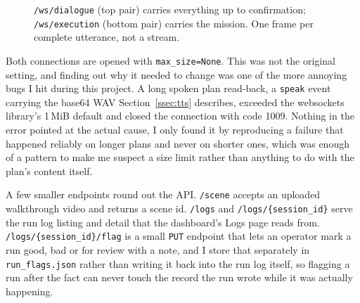 \begin{figure}[htbp]
  \centering
  \caption{\texttt{/ws/dialogue} (top pair) carries everything up to confirmation; \texttt{/ws/execution} (bottom pair) carries the mission. One frame per complete utterance, not a stream.}
  \label{fig:protocol}
\end{figure}

Both connections are opened with \texttt{max\_size=None}. This was not the
original setting, and finding out why it needed to change was one of the
more annoying bugs I hit during this project. A long spoken plan read-back,
a \texttt{speak} event carrying the base64 WAV Section~\ref{ssec:tts}
describes, exceeded the websockets library's 1\,MiB default and closed the
connection with code 1009. Nothing in the error pointed at the actual
cause, I only found it by reproducing a failure that happened reliably on
longer plans and never on shorter ones, which was enough of a pattern to
make me suspect a size limit rather than anything to do with the plan's
content itself.

A few smaller endpoints round out the API. \texttt{/scene} accepts an
uploaded walkthrough video and returns a scene id. \texttt{/logs} and
\texttt{/logs/\{session\_id\}} serve the run log listing and detail that
the dashboard's Logs page reads from. \texttt{/logs/\{session\_id\}/flag}
is a small \texttt{PUT} endpoint that lets an operator mark a run good, bad
or for review with a note, and I store that separately in
\texttt{run\_flags.json} rather than writing it back into the run log
itself, so flagging a run after the fact can never touch the record the
run wrote while it was actually happening.

